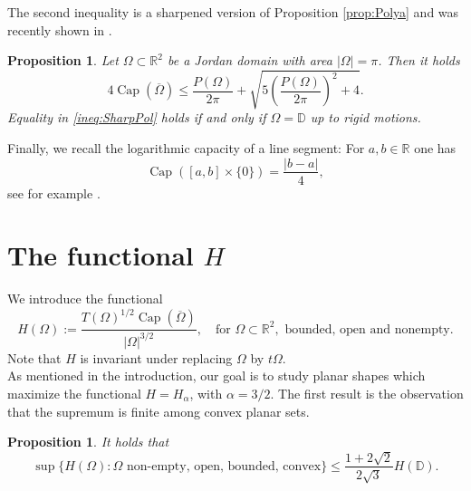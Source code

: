 \documentclass[11pt]{article}
\theoremstyle{plain}
\numberwithin{equation}{section}
\newtheorem{proposition}[theorem]{Proposition}
\theoremstyle{definition}
\DeclareMathOperator{\cp}{Cap}
\def \Om{\Omega}
\def \R {\mathbb{R}}
\def \mb{\mathbb}
\begin{document}
    The second inequality is a sharpened version of Proposition \ref{prop:Polya} and was recently shown in \cite[Lemma 4.4]{niebel2025globalrigiditytwodimensionalbubbles}.
    \begin{proposition}
    \label{prop:mainInequality}
    Let $\Om \subset \R^2$ be a Jordan domain with area $|\Om|=\pi$. Then it holds
    \begin{equation}
        \label{ineq:SharpPol}
        4\cp(\overline \Om)\leq \frac{P(\Om)}{2\pi}+\sqrt{5\left(\frac{P(\Om)}{2\pi}\right)^2+4}.
    \end{equation}
    Equality in \eqref{ineq:SharpPol} holds if and only if $\Om=\mb D$ up to rigid motions.
    \end{proposition}
    Finally, we recall the logarithmic capacity of a line segment: For $a,b \in \R$ one has
    \begin{equation}
        \label{eq:CapofLine}
        \cp([a,b]\times \{0\})=\frac{|b-a|}{4},
    \end{equation}
    see for example \cite[p. 335]{pommerenke1975univalent}.
    
    \section{The functional $H$}
    We introduce the functional
    \[
    H(\Om):=\frac{T(\Om)^{1/2}\cp(\overline \Om)}{|\Om|^{3/2}}, \quad \text{for }\Om \subset \R^2,\text{ bounded, open and nonempty.}
    \]
    Note that $H$ is invariant under replacing $\Om$ by $t\Om$.\\
    As mentioned in the introduction, our goal is to study planar shapes which maximize the functional $H=H_{\alpha}$, with $\alpha=3/2$. The first result is the observation that the supremum is finite among convex planar sets.
    \begin{proposition}
        \label{prop:FiniteSupH}
        It holds that
        \[
        \sup\{H(\Om): \Om \text{ non-empty, open, bounded, convex}\}\leq  \frac{1+2\sqrt 2}{2\sqrt 3} H(\mb D).
        \]
    \end{proposition}
\end{document}
